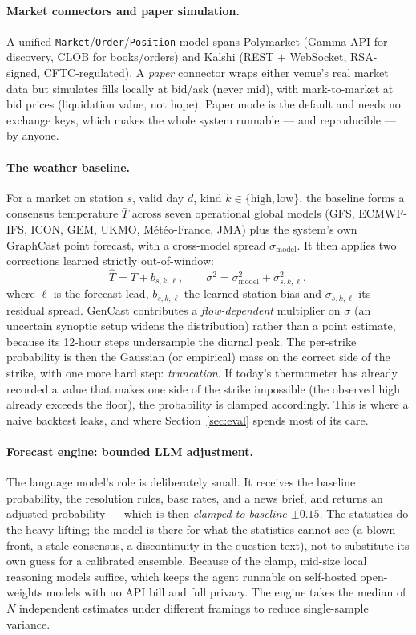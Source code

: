 \documentclass[sigconf,review,anonymous]{acmart}
\begin{document}
\paragraph{Market connectors and paper simulation.}
A unified \texttt{Market}/\texttt{Order}/\texttt{Position} model spans Polymarket
(Gamma API for discovery, CLOB for books/orders) and Kalshi (REST $+$ WebSocket,
RSA-signed, CFTC-regulated). A \emph{paper} connector wraps either venue's real
market data but simulates fills locally at bid/ask (never mid), with
mark-to-market at bid prices (liquidation value, not hope). Paper mode is the
default and needs no exchange keys, which makes the whole system runnable --- and
reproducible --- by anyone.

\paragraph{The weather baseline.}
For a market on station $s$, valid day $d$, kind $k\in\{\text{high},\text{low}\}$,
the baseline forms a consensus temperature $\bar{T}$ across seven operational
global models (GFS, ECMWF-IFS, ICON, GEM, UKMO, M\'et\'eo-France, JMA) plus the
system's own GraphCast point forecast, with a cross-model spread
$\sigma_{\text{model}}$. It then applies two corrections learned strictly
out-of-window:
\[
\hat{T} = \bar{T} + b_{s,k,\ell}, \qquad
\sigma^2 = \sigma_{\text{model}}^2 + \sigma_{s,k,\ell}^2 ,
\]
where $\ell$ is the forecast lead, $b_{s,k,\ell}$ the learned station bias and
$\sigma_{s,k,\ell}$ its residual spread. GenCast contributes a
\emph{flow-dependent} multiplier on $\sigma$ (an uncertain synoptic setup widens
the distribution) rather than a point estimate, because its 12-hour steps
undersample the diurnal peak. The per-strike probability is then the Gaussian (or
empirical) mass on the correct side of the strike, with one more hard step:
\emph{truncation}. If today's thermometer has already recorded a value that makes
one side of the strike impossible (the observed high already exceeds the floor),
the probability is clamped accordingly. This is where a naive backtest leaks, and
where Section~\ref{sec:eval} spends most of its care.

\paragraph{Forecast engine: bounded LLM adjustment.}
The language model's role is deliberately small. It receives the baseline
probability, the resolution rules, base rates, and a news brief, and returns an
adjusted probability --- which is then \emph{clamped to baseline $\pm 0.15$}. The
statistics do the heavy lifting; the model is there for what the statistics cannot
see (a blown front, a stale consensus, a discontinuity in the question text), not
to substitute its own guess for a calibrated ensemble. Because of the clamp,
mid-size local reasoning models suffice, which keeps the agent runnable on
self-hosted open-weights models with no API bill and full privacy. The engine
takes the median of $N$ independent estimates under different framings to reduce
single-sample variance.
\end{document}
